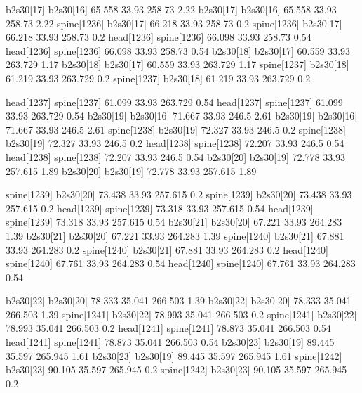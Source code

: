 b2s30[17]    b2s30[16]    65.558    33.93    258.73    2.22
b2s30[17]    b2s30[16]    65.558    33.93    258.73    2.22
spine[1236]    b2s30[17]    66.218    33.93    258.73    0.2
spine[1236]    b2s30[17]    66.218    33.93    258.73    0.2
head[1236]    spine[1236]    66.098    33.93    258.73    0.54
head[1236]    spine[1236]    66.098    33.93    258.73    0.54
b2s30[18]    b2s30[17]    60.559    33.93    263.729    1.17
b2s30[18]    b2s30[17]    60.559    33.93    263.729    1.17
spine[1237]    b2s30[18]    61.219    33.93    263.729    0.2
spine[1237]    b2s30[18]    61.219    33.93    263.729    0.2


head[1237]    spine[1237]    61.099    33.93    263.729    0.54
head[1237]    spine[1237]    61.099    33.93    263.729    0.54
b2s30[19]    b2s30[16]    71.667    33.93    246.5    2.61
b2s30[19]    b2s30[16]    71.667    33.93    246.5    2.61
spine[1238]    b2s30[19]    72.327    33.93    246.5    0.2
spine[1238]    b2s30[19]    72.327    33.93    246.5    0.2
head[1238]    spine[1238]    72.207    33.93    246.5    0.54
head[1238]    spine[1238]    72.207    33.93    246.5    0.54
b2s30[20]    b2s30[19]    72.778    33.93    257.615    1.89
b2s30[20]    b2s30[19]    72.778    33.93    257.615    1.89


spine[1239]    b2s30[20]    73.438    33.93    257.615    0.2
spine[1239]    b2s30[20]    73.438    33.93    257.615    0.2
head[1239]    spine[1239]    73.318    33.93    257.615    0.54
head[1239]    spine[1239]    73.318    33.93    257.615    0.54
b2s30[21]    b2s30[20]    67.221    33.93    264.283    1.39
b2s30[21]    b2s30[20]    67.221    33.93    264.283    1.39
spine[1240]    b2s30[21]    67.881    33.93    264.283    0.2
spine[1240]    b2s30[21]    67.881    33.93    264.283    0.2
head[1240]    spine[1240]    67.761    33.93    264.283    0.54
head[1240]    spine[1240]    67.761    33.93    264.283    0.54


b2s30[22]    b2s30[20]    78.333    35.041    266.503    1.39
b2s30[22]    b2s30[20]    78.333    35.041    266.503    1.39
spine[1241]    b2s30[22]    78.993    35.041    266.503    0.2
spine[1241]    b2s30[22]    78.993    35.041    266.503    0.2
head[1241]    spine[1241]    78.873    35.041    266.503    0.54
head[1241]    spine[1241]    78.873    35.041    266.503    0.54
b2s30[23]    b2s30[19]    89.445    35.597    265.945    1.61
b2s30[23]    b2s30[19]    89.445    35.597    265.945    1.61
spine[1242]    b2s30[23]    90.105    35.597    265.945    0.2
spine[1242]    b2s30[23]    90.105    35.597    265.945    0.2


